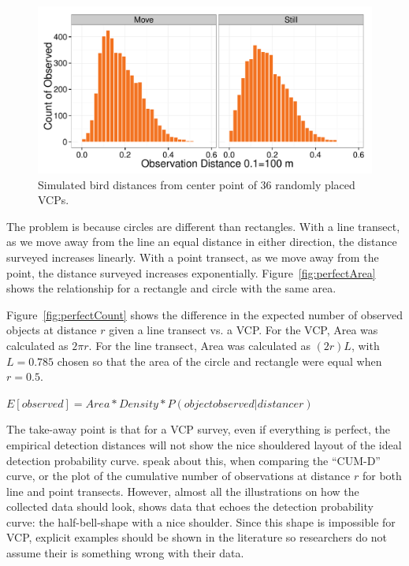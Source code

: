 \documentclass[12pt]{article}
\begin{document}
\begin{figure}[h]
	\center
	\includegraphics[width=\textwidth]{../images/movementTest.pdf}
	\caption{Simulated bird distances from center point of 36 randomly placed VCPs.\label{fig:moveTest}}
\end{figure}

The problem is because circles are different than rectangles. With a line transect, as we move away from the line an equal distance in either direction, the distance surveyed increases linearly. With a point transect, as we move away from the point, the distance surveyed increases exponentially. Figure~\ref{fig:perfectArea} shows the relationship for a rectangle and circle with the same area. 

Figure~\ref{fig:perfectCount} shows the difference in the expected number of observed objects at distance $r$ given a line transect vs. a VCP. For the VCP, Area was calculated as $2\pi r$. For the line transect, Area was calculated as $(2r)L$, with $L=0.785$ chosen so that the area of the circle and rectangle were equal when $r=0.5$.

$E[observed] = Area*Density*P(object observed | distance r)$

The take-away point is that for a VCP survey, even if everything is perfect, the empirical detection distances will not show the nice shouldered layout of the ideal detection probability curve. \textcite{ramsey1981} speak about this, when comparing the ``CUM-D'' curve, or the plot of the cumulative number of observations at distance $r$ for both line and point transects. However, almost all the illustrations on how the collected data should look, shows data that echoes the detection probability curve: the half-bell-shape with a nice shoulder. Since this shape is impossible for VCP, explicit examples should be shown in the literature so researchers do not assume their is something wrong with their data.
\end{document}
